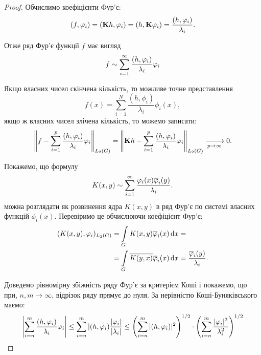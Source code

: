 \begin{proof}
	Обчислимо коефіцієнти Фур'є:
	\begin{equation}
		(f, \phi_i) = (\bf{K}h, \phi_i) = (h, \bf{K}\phi_i) = \frac{(h,\phi_i)}{\lambda_i}.
	\end{equation}

	Отже ряд Фур'є функції $f$ має вигляд 
	\begin{equation}
		f \sim \Sum_{i = 1}^\infty \dfrac{(h, \phi_i)}{\lambda_i} \phi_i
	\end{equation}

	Якщо власних чисел скінчена кількість, то можливе точне представлення 
	\begin{equation}
		f(x) = \sum_{i=1}^N \frac{(h, \phi_i)}{\lambda_i} \phi_i(x),
	\end{equation}
	якщо ж власних чисел злічена кількість, то  можемо записати:
	\begin{equation}
		\left\| f - \Sum_{i = 1}^p \dfrac{(h, \phi_i)}{\lambda_i} \phi_i \right\|_{L_2(G)} = \left\| \bf{K}h - \Sum_{i = 1}^p \dfrac{(h, \phi_i)}{\lambda_i} \phi_i \right\|_{L_2(G)} \xrightarrow[p \to \infty]{}0.
	\end{equation}

	Покажемо, що формулу 
	\begin{equation}
		K(x, y) \sim \Sum_{i = 1}^\infty \dfrac{\phi_i(x) \overline \phi_i(y)}{\lambda_i}.
	\end{equation}
	можна розглядати як розвинення ядра $K(x, y)$ в ряд Фур'є по системі власних функцій $\phi_i(x)$. Перевіримо це обчислюючи коефіцієнт Фур'є:
	\begin{equation}
		\begin{aligned}
			(K(x, y),\phi_i)_{L_2(G)} &= \Int_G K(x, y) \overline \phi_i(x) \diff x = \\
			&= \Int_G \overline {K(y, x)} \overline \phi_i(x) \diff x = \dfrac{\overline \phi_i(y)}{\lambda_i}.
		\end{aligned}
	\end{equation}

	Доведемо рівномірну збіжність ряду Фур'є за критерієм Коші і покажемо, що при, $n, m \to \infty$, відрізок ряду прямує до нуля. За нерівністю Коші-Буняківського маємо:
	\begin{equation}
		\left| \Sum_{i = n}^m \dfrac{(h, \phi_i)}{\lambda_i} \phi_i \right| \le \Sum_{i = n}^m |(h, \phi_i)\dfrac{|\phi_i|}{|\lambda_i|} \le \left(\Sum_{i=n}^m |(h, \phi_i)|^2\right)^{1/2} \cdot \left(\Sum_{i=n}^m \dfrac{|\phi_i|^2}{\lambda_i^2}\right)^{1/2}
	\end{equation}


\end{proof}
